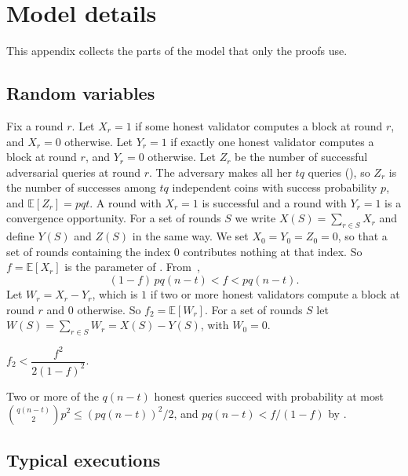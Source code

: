 \section{Model details}
\label{appendix.model}

This appendix collects the parts of the model that only the proofs use.

\subsection{Random variables}

Fix a round $r$. Let $X_r=1$ if some honest validator computes a block at round
$r$, and $X_r=0$ otherwise. Let $Y_r=1$ if exactly one honest validator computes
a block at round $r$, and $Y_r=0$ otherwise. Let $Z_r$ be the number of
successful adversarial queries at round $r$. The adversary makes all her $tq$
queries (), so $Z_r$ is the number of successes among $tq$
independent coins with success probability $p$, and $\mathbb{E}[Z_r]=pqt$. A round with $X_r=1$ is successful
and a round with $Y_r=1$ is a convergence opportunity. For a set of rounds $S$
we write $X(S)=\sum_{r\in S}X_r$ and define $Y(S)$ and $Z(S)$ in the same way.
We set $X_0=Y_0=Z_0=0$, so that a set of rounds containing the index $0$
contributes nothing at that index. So $f=\mathbb{E}[X_r]$ is the parameter of
. From~\cite[Equation~(1)]{gkl24},
\begin{equation}\label{eq.rates}
    (1-f)\,pq(n-t) < f < pq(n-t) .
\end{equation}
Let $W_r=X_r-Y_r$, which is $1$ if two or more honest validators compute a block
at round $r$ and $0$ otherwise. So $f_2=\mathbb{E}[W_r]$. For a set of rounds
$S$ let $W(S)=\sum_{r\in S}W_r=X(S)-Y(S)$, with $W_0=0$.

\begin{lemma}\label{lem.fsq}
    $f_2 < \dfrac{f^2}{2(1-f)^2}$.
\end{lemma}

\begin{proofof}{}
    Two or more of the $q(n-t)$ honest queries succeed with probability at most
    $\binom{q(n-t)}{2}p^2\le(pq(n-t))^2/2$, and $pq(n-t)<f/(1-f)$ by
    .
\end{proofof}

\subsection{Typical executions}

